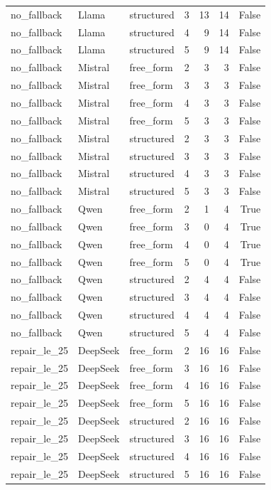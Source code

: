 \begin{longtable}{lllrrrr}
no\_fallback & Llama & structured & 3 & 13 & 14 & False \\
no\_fallback & Llama & structured & 4 & 9 & 14 & False \\
no\_fallback & Llama & structured & 5 & 9 & 14 & False \\
no\_fallback & Mistral & free\_form & 2 & 3 & 3 & False \\
no\_fallback & Mistral & free\_form & 3 & 3 & 3 & False \\
no\_fallback & Mistral & free\_form & 4 & 3 & 3 & False \\
no\_fallback & Mistral & free\_form & 5 & 3 & 3 & False \\
no\_fallback & Mistral & structured & 2 & 3 & 3 & False \\
no\_fallback & Mistral & structured & 3 & 3 & 3 & False \\
no\_fallback & Mistral & structured & 4 & 3 & 3 & False \\
no\_fallback & Mistral & structured & 5 & 3 & 3 & False \\
no\_fallback & Qwen & free\_form & 2 & 1 & 4 & True \\
no\_fallback & Qwen & free\_form & 3 & 0 & 4 & True \\
no\_fallback & Qwen & free\_form & 4 & 0 & 4 & True \\
no\_fallback & Qwen & free\_form & 5 & 0 & 4 & True \\
no\_fallback & Qwen & structured & 2 & 4 & 4 & False \\
no\_fallback & Qwen & structured & 3 & 4 & 4 & False \\
no\_fallback & Qwen & structured & 4 & 4 & 4 & False \\
no\_fallback & Qwen & structured & 5 & 4 & 4 & False \\
repair\_le\_25 & DeepSeek & free\_form & 2 & 16 & 16 & False \\
repair\_le\_25 & DeepSeek & free\_form & 3 & 16 & 16 & False \\
repair\_le\_25 & DeepSeek & free\_form & 4 & 16 & 16 & False \\
repair\_le\_25 & DeepSeek & free\_form & 5 & 16 & 16 & False \\
repair\_le\_25 & DeepSeek & structured & 2 & 16 & 16 & False \\
repair\_le\_25 & DeepSeek & structured & 3 & 16 & 16 & False \\
repair\_le\_25 & DeepSeek & structured & 4 & 16 & 16 & False \\
repair\_le\_25 & DeepSeek & structured & 5 & 16 & 16 & False \\

\end{longtable}
